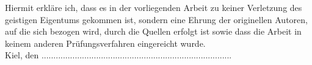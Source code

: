 \null
\vfill
{}
Hiermit erkläre ich, dass es in der vorliegenden Arbeit zu keiner Verletzung des geistigen Eigentums gekommen ist, sondern eine Ehrung der originellen Autoren, auf die sich bezogen wird, durch die Quellen erfolgt ist sowie dass die Arbeit in keinem anderen Prüfungsverfahren eingereicht wurde.\\

Kiel, den ....................\quad\quad\quad............................................................